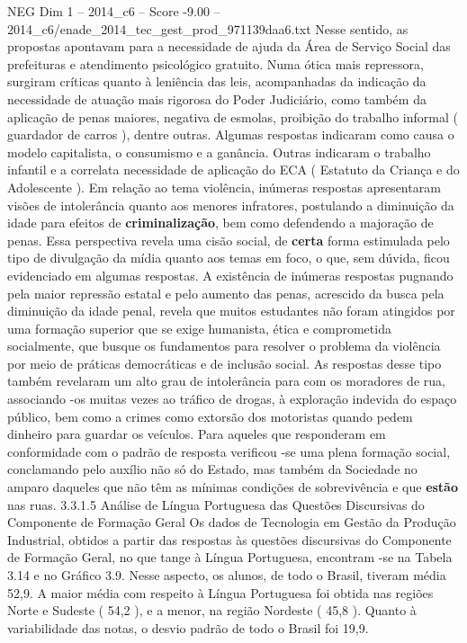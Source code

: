 \begin{textsample}{NEG Dim 1 – 2014\_c6 – Score -9.00 – 2014\_c6/enade\_2014\_tec\_gest\_prod\_971139daa6.txt}
Nesse sentido, as propostas apontavam para a necessidade de ajuda da Área de Serviço Social das prefeituras e atendimento psicológico gratuito.
Numa ótica mais repressora, surgiram críticas quanto à leniência das leis, acompanhadas da indicação da necessidade de atuação mais rigorosa do Poder Judiciário, como também da aplicação de penas maiores, negativa de esmolas, proibição do trabalho informal ( guardador de carros ), dentre outras.
Algumas respostas indicaram como causa o modelo capitalista, o consumismo e a ganância.
Outras indicaram o trabalho infantil e a correlata necessidade de aplicação do ECA ( Estatuto da Criança e do Adolescente ).
Em relação ao tema violência, inúmeras respostas apresentaram visões de intolerância quanto aos menores infratores, postulando a diminuição da idade para efeitos de \textbf{criminalização}, bem como defendendo a majoração de penas.
Essa perspectiva revela uma cisão social, de \textbf{certa} forma estimulada pelo tipo de divulgação da mídia quanto aos temas em foco, o que, sem dúvida, ficou evidenciado em algumas respostas.
A existência de inúmeras respostas pugnando pela maior repressão estatal e pelo aumento das penas, acrescido da busca pela diminuição da idade penal, revela que muitos estudantes não foram atingidos por uma formação superior que se exige humanista, ética e comprometida socialmente, que busque os fundamentos para resolver o problema da violência por meio de práticas democráticas e de inclusão social.
As respostas desse tipo também revelaram um alto grau de intolerância para com os moradores de rua, associando -os muitas vezes ao tráfico de drogas, à exploração indevida do espaço público, bem como a crimes como extorsão dos motoristas quando pedem dinheiro para guardar os veículos.
Para aqueles que responderam em conformidade com o padrão de resposta verificou -se uma plena formação social, conclamando pelo auxílio não só do Estado, mas também da Sociedade no amparo daqueles que não têm as mínimas condições de sobrevivência e que \textbf{estão} nas ruas. 3.3.1.5 Análise de Língua Portuguesa das Questões Discursivas do Componente de Formação Geral Os dados de Tecnologia em Gestão da Produção Industrial, obtidos a partir das respostas às questões discursivas do Componente de Formação Geral, no que tange à Língua Portuguesa, encontram -se na Tabela 3.14 e no Gráfico 3.9.
Nesse aspecto, os alunos, de todo o Brasil, tiveram média 52,9.
A maior média com respeito à Língua Portuguesa foi obtida nas regiões Norte e Sudeste ( 54,2 ), e a menor, na região Nordeste ( 45,8 ).
Quanto à variabilidade das notas, o desvio padrão de todo o Brasil foi 19,9.

\end{textsample}
